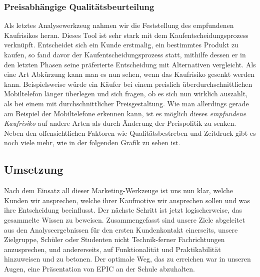\subsubsection{Preisabhängige Qualitätsbeurteilung}
Als letztes Analysewerkzeug nahmen wir die Feststellung des empfundenen Kaufrisikos heran. Dieses Tool ist sehr stark mit dem Kaufentscheidungsprozess verknüpft. Entscheidet sich ein Kunde erstmalig, ein bestimmtes Produkt zu kaufen, so fand davor der Kaufentscheidungsprozess statt, mithilfe dessen er in den letzten Phasen seine präferierte Entscheidung mit Alternativen vergleicht. Als eine Art Abkürzung kann man es nun sehen, wenn das Kaufrisiko gesenkt werden kann. Beispielsweise würde ein Käufer bei einem preislich überdurchschnittlichen Mobiltelefon länger überlegen und sich fragen, ob es sich nun wirklich auszahlt, als bei einem mit durchschnittlicher Preisgestaltung. Wie man allerdings gerade am Beispiel der Mobiltelefone erkennen kann, ist es möglich dieses \textit{empfundene Kaufrisiko} auf andere Arten als durch Änderung der Preispolitik zu senken. Neben den offensichtlichen Faktoren wie Qualitätsbestreben und Zeitdruck gibt es noch viele mehr, wie in der folgenden Grafik zu sehen ist.\\

\subsection{Umsetzung}
Nach dem Einsatz all dieser Marketing-Werkzeuge ist uns nun klar, welche Kunden wir ansprechen, welche ihrer Kaufmotive wir ansprechen sollen und was ihre Entscheidung beeinflusst. Der nächste Schritt ist jetzt logischerweise, das gesammelte Wissen zu beweisen. Zusammengefasst sind unsere Ziele abgeleitet aus den Analyseergebnissen für den ersten Kundenkontakt einerseits, unsere Zielgruppe, Schüler oder Studenten nicht Technik-ferner Fachrichtungen anzusprechen, und andererseits, auf Funktionalität und Praktikabilität hinzuweisen und zu betonen. Der optimale Weg, das zu erreichen war in unseren Augen, eine Präsentation von EPIC an der Schule abzuhalten.